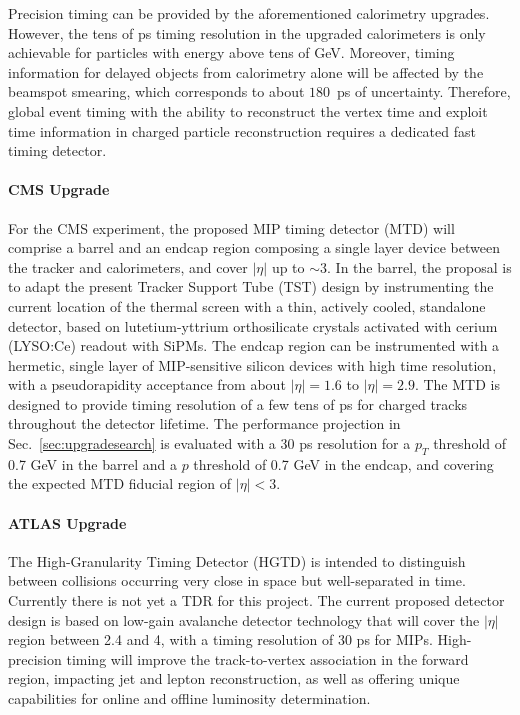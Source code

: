 Precision timing can be provided by the aforementioned calorimetry upgrades. 
However, the tens of ps timing resolution in the upgraded calorimeters is only achievable for particles with energy above tens of GeV. 
Moreover, timing information for delayed objects from calorimetry alone will be affected by the beamspot smearing, which corresponds to about $180$~ps of uncertainty.
Therefore, global event timing with the ability to reconstruct the vertex time and exploit time information in charged particle reconstruction requires a dedicated fast timing detector.

\paragraph{CMS Upgrade} 
For the CMS experiment, the proposed MIP timing detector (MTD) will comprise a barrel and an endcap region composing a single layer device between the tracker and calorimeters, and cover $|\eta|$ up to $\sim3$. 
In the barrel, the proposal is to adapt the present Tracker Support Tube (TST) design by instrumenting the current location of the thermal screen with a thin, actively cooled, standalone detector, based on lutetium-yttrium orthosilicate crystals activated with cerium (LYSO:Ce) readout with SiPMs.
The endcap region can be instrumented with a hermetic, single layer of MIP-sensitive silicon devices with high time resolution, with a pseudorapidity acceptance from about $|\eta|=1.6$ to $|\eta|=2.9$.
The MTD is designed to provide timing resolution of a few tens of ps for charged tracks throughout the detector lifetime. 
The performance projection in Sec.~\ref{sec:upgradesearch} is evaluated with a 30 ps resolution for a $p_T$ threshold of 0.7 GeV in the barrel and a $p$ threshold of 0.7 GeV in the endcap, and covering the expected MTD fiducial region of $|\eta| < 3$.

\paragraph{ATLAS Upgrade}
The High-Granularity Timing Detector (HGTD) is intended to distinguish between collisions occurring very close in space but
well-separated in time. Currently there is not yet a TDR for this project.
The current proposed detector design is based on low-gain avalanche
detector technology that will cover the $|\eta|$ region between 2.4 and 4,
with a timing resolution of 30 ps for MIPs. High-precision timing
will improve the track-to-vertex association in the forward region, impacting jet and lepton
reconstruction, as well as offering unique capabilities for online and offline luminosity determination.


